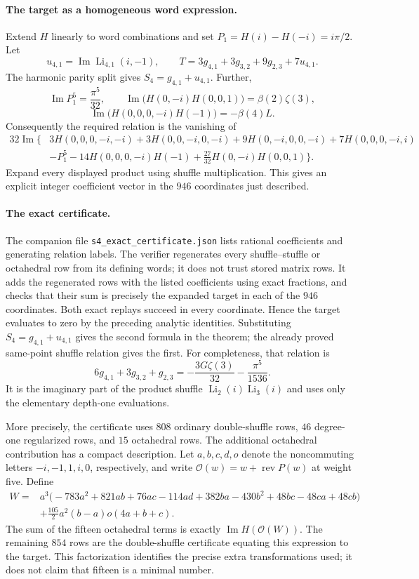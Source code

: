 \documentclass[11pt]{article}
\numberwithin{equation}{section}
\theoremstyle{plain}
\theoremstyle{definition}
\theoremstyle{remark}
\DeclareMathOperator{\Li}{Li}
\begin{document}
\paragraph{The target as a homogeneous word expression.}
Extend $H$ linearly to word combinations and set
$P_1=H(i)-H(-i)=i\pi/2$.  Let
\[
 u_{4,1}=\operatorname{Im}\operatorname{Li}_{4,1}(i,-1),
 \qquad T=3g_{4,1}+3g_{3,2}+9g_{2,3}+7u_{4,1}.
\]
The harmonic parity split gives $S_4=g_{4,1}+u_{4,1}$.  Further,
\[
 \operatorname{Im}P_1^5=\frac{\pi^5}{32},\qquad
 \operatorname{Im}\bigl(H(0,-i)H(0,0,1)\bigr)=\beta(2)\zeta(3),
\]
\[
 \operatorname{Im}\bigl(H(0,0,0,-i)H(-1)\bigr)=-\beta(4)L.
\]
Consequently the required relation is the vanishing of
\begin{align*}
 32\operatorname{Im}\{&3H(0,0,0,-i,-i)+3H(0,0,-i,0,-i)
 +9H(0,-i,0,0,-i)+7H(0,0,0,-i,i)\\
 &-P_1^5-14H(0,0,0,-i)H(-1)
 +\tfrac{27}{32}H(0,-i)H(0,0,1)\}.
\end{align*}
Expand every displayed product using shuffle multiplication.  This gives
an explicit integer coefficient vector in the $946$ coordinates just described.

\paragraph{The exact certificate.}
The companion file \texttt{s4\_exact\_certificate.json} lists rational
coefficients and generating relation labels.  The verifier regenerates
every shuffle--stuffle or octahedral row from its defining words; it does
not trust stored matrix rows.  It adds the regenerated rows with the
listed coefficients using exact fractions, and checks that their sum
is precisely the expanded target in each of the $946$ coordinates.
Both exact replays succeed in every coordinate.  Hence the target evaluates to zero by
the preceding analytic identities.  Substituting $S_4=g_{4,1}+u_{4,1}$
gives the second formula in the theorem; the already proved same-point shuffle relation gives the first. For
completeness, that relation is
\[
 6g_{4,1}+3g_{3,2}+g_{2,3}
 =-\frac{3G\zeta(3)}{32}-\frac{\pi^5}{1536}.
\]
It is the imaginary part of the product shuffle
$\Li_2(i)\Li_3(i)$ and uses only the elementary depth-one evaluations.

More precisely, the certificate uses $808$ ordinary double-shuffle
rows, $46$ degree-one regularized rows, and $15$ octahedral rows.
The additional octahedral contribution has a compact description.
Let $a,b,c,d,o$ denote the noncommuting letters $-i,-1,1,i,0$, respectively,
and write $\mathcal O(w)=w+\operatorname{rev}P(w)$ at weight five.  Define
\begin{align*}
 W={}&a^3\bigl(-783a^2+821ab+76ac-114ad+382ba-430b^2
                     +48bc-48ca+48cb\bigr)\\
   &+\frac{105}{2}a^2(b-a)o(4a+b+c).
\end{align*}
The sum of the fifteen octahedral terms is exactly
$\operatorname{Im}H(\mathcal O(W))$.  The remaining $854$ rows are the
double-shuffle certificate equating this expression to the target.
This factorization identifies the precise extra transformations used;
it does not claim that fifteen is a minimal number.
\end{document}
